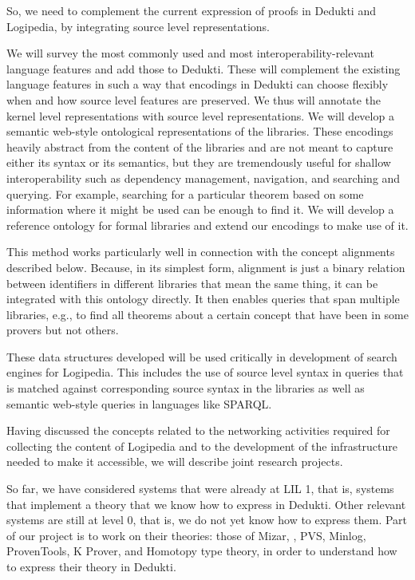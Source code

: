 So, we need to complement the current expression of proofs in Dedukti
and Logipedia, by integrating source level representations.

We will survey the most commonly used and most
interoperability-relevant language features and add those to Dedukti.
These will complement the existing language features in such a way
that encodings in Dedukti can choose flexibly when and how source
level features are preserved.  We thus will annotate the kernel level
representations with source level representations.  We will develop a
semantic web-style ontological representations of the libraries.
These encodings heavily abstract from the content of the libraries and
are not meant to capture either its syntax or its semantics, but they
are tremendously useful for shallow interoperability such as
dependency management, navigation, and searching and querying.  For
example, searching for a particular theorem based on some information
where it might be used can be enough to find it.  We will develop a
reference ontology for formal libraries and extend our encodings to
make use of it.

This method works particularly well in connection with the concept alignments
described below. Because, in its simplest form, alignment is just a
binary relation between identifiers in different libraries that mean
the same thing, it can be integrated with this ontology directly.  It
then enables queries that span multiple libraries, e.g., to find all
theorems about a certain concept that have been in some provers but not
others.

These data structures developed will be used
critically in development of search engines for Logipedia.  This
includes the use of source level syntax in queries that is matched
against corresponding source syntax in the libraries as well as
semantic web-style queries in languages like SPARQL.


Having discussed the concepts related to the networking activities
required for collecting the content of Logipedia and to the
development of the infrastructure needed to make it accessible, we
will describe joint research projects.

So far, we have considered systems that were already at LIL 1, that
is, systems that implement a theory that we know how to express in
Dedukti.  Other relevant systems are still at level 0, that is, we do
not yet know how to express them. Part of our project is to work on
their theories: those of Mizar, \tlaplus, PVS, Minlog, ProvenTools,
K Prover, and Homotopy type theory, in order to understand how
to express their theory in Dedukti.

